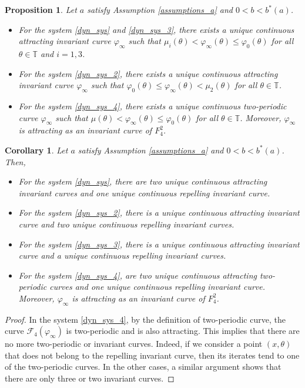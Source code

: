 \documentclass[12pt]{article}
\newcommand{\T}{\mathbb{T}}
\theoremstyle{plain}
\newtheorem{prop}[defn]{Proposition}
\newtheorem{corollary}[defn]{Corollary}
\theoremstyle{remark}
\theoremstyle{definition}
\begin{document}
\begin{prop}\label{prop_onlyonecurve}
    Let $a$ satisfy Assumption \eqref{assumptions_a} and $0<b<b^*(a)$. 
    \begin{itemize}
        \item For the system \eqref{dyn_sys} and \eqref{dyn_sys_3}, there exists a unique continuous attracting invariant curve $\varphi_\infty$ such that $\mu_i(\theta)<\varphi_\infty(\theta)\leq\varphi_0(\theta)$ for all $\theta\in\T$ and $i=1,3$.
        \item For the system \eqref{dyn_sys_2}, there exists a unique continuous attracting invariant curve $\varphi_\infty$ such that $\varphi_0(\theta)\leq\varphi_\infty(\theta)<\mu_2(\theta)$ for all $\theta\in\T$.
        \item For the system \eqref{dyn_sys_4}, there exists a unique continuous two-periodic curve $\varphi_\infty$ such that $\mu(\theta)<\varphi_\infty(\theta)\leq\varphi_0(\theta)$ for all $\theta\in\T$. Moreover, $\varphi_\infty$ is attracting as an invariant curve of $F_4^2$.
    \end{itemize} 
\end{prop}
\begin{corollary}\label{coro_numbercurves}
    Let $a$ satisfy Assumption \eqref{assumptions_a} and $0<b<b^*(a)$. Then,
    \begin{itemize}
        \item For the system \eqref{dyn_sys}, there are two unique continuous attracting invariant curves and one unique continuous repelling invariant curve.
        \item For the system \eqref{dyn_sys_2}, there is a unique continuous attracting invariant curve and two unique continuous repelling invariant curves.
        \item For the system \eqref{dyn_sys_3}, there is a unique continuous attracting invariant curve and a unique continuous repelling invariant curves.
        \item For the system \eqref{dyn_sys_4}, are two unique continuous attracting two-periodic curves and one unique continuous repelling invariant curve. Moreover, $\varphi_\infty$ is attracting as an invariant curve of $F_4^2$.
    \end{itemize}
\end{corollary}
\begin{proof}
    In the system \eqref{dyn_sys_4}, by the definition of two-periodic curve, the curve $\mathcal{F}_4(\varphi_\infty)$ is two-periodic and is also attracting. This implies that there are no more two-periodic or invariant curves. Indeed, if we consider a point $(x,\theta)$ that does not belong to the repelling invariant curve, then its iterates tend to one of the two-periodic curves. In the other cases, a similar argument shows that there are only three or two invariant curves.
\end{proof}
\end{document}
